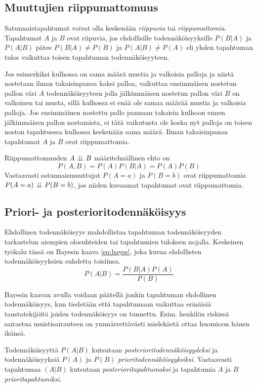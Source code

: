 \subsection{Muuttujien riippumattomuus}
Satunnaistapahtumat voivat olla keskenään \emph{riippuvia} tai \emph{riippumattomia}. Tapahtumat $A$ ja $B$ ovat riipuvia, jos ehdollisille todennäköisyyksille $P(B|A)$ ja $P(A|B)$ pätee $P(B|A) \not= P(B)$ ja $P(A|B) \not= P(A)$ eli yhden tapahtuman tulos vaikuttaa toisen tapahtuman todennäköisyyteen.

Jos esimerkiksi  kulhossa on sama määrä mustia ja valkoisia palloja ja niistä nostetaan ilman takaisinpanoa kaksi palloa, vaikuttaa ensimmäisen nostetun pallon väri $A$ todennäköisyyteen jolla jälkimmäisen nostetun pallon väri $B$ on valkoinen tai musta, sillä kulhossa ei enää ole samaa määrää mustia ja valkoisia palloja. Jos ensimmäinen nostettu pallo pannaan takaisin kulhoon ennen jälkimmäisen pallon nostamista, ei tätä vaikutusta ole koska nyt palloja on toisen noston tapahtuessa kulhossa keskenään sama määrä. Ilman takaisinpanoa tapahtumat $A$ ja $B$ ovat riippumattomia. 

Riippumattomuuden $A \perp \!\!\! \perp B$ määritelmällinen ehto on
$$
    P(A,B) = P(A)P(B|A) = P(A)P(B) 
$$ 
Vastaavasti satunnaismuuttujat $P(A = a)$ ja $P(B = b)$ ovat riippumattomia $P(A = a)  \perp \!\!\! \perp P(B = b)$, jos niiden kuvaamat tapahtumat ovat riippumattomia. 


\subsection{Priori- ja posterioritodennäköisyys}
Ehdollinen todennäköisyys mahdollistaa  tapahtuman todennäköisyyden tarkastelun aiempien olosuhteiden tai tapahtumien tuloksen nojalla. Keskeinen työkalu tässä on Bayesin kaava \ref{eq:bayes}, joka kuvaa ehdollisten todennäköisyyksien suhdetta toisiinsa.
\begin{equation}\label{eq:bayes}
        P(A|B) = \frac{P(B|A)P(A)}{P(B)}
\end{equation}

Bayesin kaavan avulla voidaan päätellä jonkin tapahtuman ehdollinen todennäköisyys, kun tiedetään että tapahtumaan vaikuttaa erinäisiä taustatekijöitä joiden todennäköisyys on tunnettu. Esim. henkilön riskissä sairastua muistisairauteen on ymmärrettävästi mielekästä ottaa huomioon hänen ikänsä.

Todennäköisyyttä $P(A|B)$ kutsutaan \emph{posterioritodennäköisyydeksi} ja todennäköisyyksiä $P(A)$ ja $P(B)$ \emph{prioritodennäköisyyksiksi}. Vastaavasti tapahtumaa $(A|B)$ kutsutaan \emph{posterioritapahtumaksi} ja tapahtumia $A$ ja $B$ \emph{prioritapahtumiksi}.
